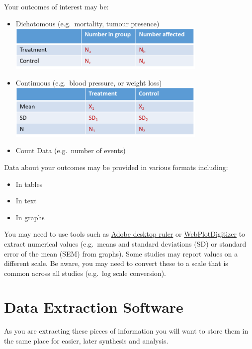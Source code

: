 \documentclass[
]{book}
\begin{document}
Your outcomes of interest may be:

\begin{itemize}
\item
  Dichotomous (e.g.~mortality, tumour presence) \includegraphics[width=0.75\textwidth,height=0.75\textheight]{figs/dichot-outcome.png}
\item
  Continuous (e.g.~blood pressure, or weight loss) \includegraphics[width=0.75\textwidth,height=0.75\textheight]{figs/contin-outcome.png}
\item
  Count Data (e.g.~number of events)
\end{itemize}

Data about your outcomes may be provided in various formats including:

\begin{itemize}
\item
  In tables
\item
  In text
\item
  In graphs
\end{itemize}

You may need to use tools such as \href{https://helpx.adobe.com/acrobat/using/grids-guides-measurements-pdfs.html}{Adobe desktop ruler} or \href{https://automeris.io/WebPlotDigitizer/}{WebPlotDigitizer} to extract numerical values (e.g.~means and standard deviations (SD) or standard error of the mean (SEM) from graphs). Some studies may report values on a different scale. Be aware, you may need to convert these to a scale that is common across all studies (e.g.~log scale conversion).

\hypertarget{data-extraction-software}{%
\section{Data Extraction Software}\label{data-extraction-software}}

As you are extracting these pieces of information you will want to store them in the same place for easier, later synthesis and analysis.
\end{document}
